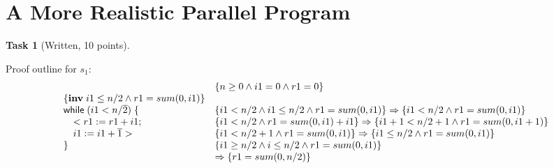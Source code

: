 \documentclass{article}
\newcommand{\stmt}[1]{\text{\sffamily #1}}
\newcommand{\while}[1]{\stmt{while}\;(#1)\;\{}
\newcommand{\assign}[2]{#1 := #2}
\newcommand{\const}[1]{\overline{#1}}
\newcommand{\inv}[1]{\{\textbf{inv}\;\ensuremath{#1}\}}
\theoremstyle{task}
\newtheorem{task}{Task}[section]
\begin{document}
\section{A More Realistic Parallel Program}

\begin{task}[Written, 10 points]
\end{task}
Proof outline for $s_1$:
\[
    \begin{array}{l l}
        & \{n \geq 0 \wedge i1 = 0 \wedge r1 = 0\} \\
        \inv{i1 \leq n/2 \wedge r1 = sum(0, i1)} & \\
        \while{i1 < n/\const{2}} & \{i1 < n/2 \wedge i1 \leq n/2 \wedge r1 = sum(0, i1)\} \Rightarrow \{i1 < n/2 \wedge r1 = sum(0, i1)\}\\
        \quad < \assign{r1}{r1 + i1}; & \{i1 < n/2 \wedge r1 = sum(0, i1) + i1\} \Rightarrow \{i1+1 < n/2+1 \wedge r1 = sum(0, i1+1)\}\\
        \quad \assign{i1}{i1 + \const{1}} > & \{i1 < n/2+1 \wedge r1 = sum(0, i1)\} \Rightarrow \{i1 \leq n/2 \wedge r1 = sum(0, i1)\}\\
        \} & \{i1 \geq n/2 \wedge i \leq n/2 \wedge r1 = sum(0, i1)\} \\
           & \Rightarrow \{r1 = sum(0, n/2)\}
    \end{array}
\]
\end{document}
